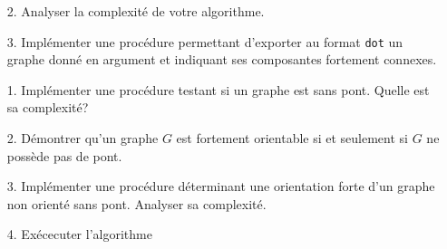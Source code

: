 \documentclass[10pt]{article} %
\begin{document}
\begin{itemize}
    \item [2.] Analyser la complexité de votre algorithme.
\end{itemize}

\begin{itemize}
    \item [3.] Implémenter une procédure permettant d'exporter au format \texttt{dot} un graphe donné en argument et indiquant ses composantes fortement connexes.
\end{itemize}

\vspace{.5cm}
\noindent {} 

\begin{itemize}
    \item [1.] Implémenter une procédure testant si un graphe est sans pont. Quelle est sa complexité?
\end{itemize}

\begin{itemize}
    \item [2.] Démontrer qu'un graphe $G$ est fortement orientable si et seulement si $G$ ne possède pas de pont.
\end{itemize}

\begin{itemize}
    \item [3.] Implémenter une procédure déterminant une orientation forte d'un graphe non orienté sans pont. Analyser sa complexité.
\end{itemize}

\begin{itemize}
    \item[4.] Exécecuter l'algorithme
\end{itemize}



\end{document}
